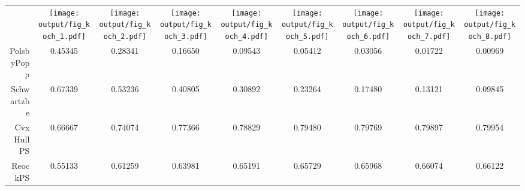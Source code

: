 \documentclass{standalone}
\begin{document}
\begin{tabular}{rcccccccc}
 & \texttt{[image: output/fig\_koch\_1.pdf]} & \texttt{[image: output/fig\_koch\_2.pdf]} & \texttt{[image: output/fig\_koch\_3.pdf]} & \texttt{[image: output/fig\_koch\_4.pdf]} & \texttt{[image: output/fig\_koch\_5.pdf]} & \texttt{[image: output/fig\_koch\_6.pdf]} & \texttt{[image: output/fig\_koch\_7.pdf]} & \texttt{[image: output/fig\_koch\_8.pdf]} \\ 
  PolsbyPopp & 0.45345 & 0.28341 & 0.16650 & 0.09543 & 0.05412 & 0.03056 & 0.01722 & 0.00969 \\ 
  Schwartzbe & 0.67339 & 0.53236 & 0.40805 & 0.30892 & 0.23264 & 0.17480 & 0.13121 & 0.09845 \\ 
  CvxHullPS & 0.66667 & 0.74074 & 0.77366 & 0.78829 & 0.79480 & 0.79769 & 0.79897 & 0.79954 \\ 
  ReockPS & 0.55133 & 0.61259 & 0.63981 & 0.65191 & 0.65729 & 0.65968 & 0.66074 & 0.66122 \\ 
\end{tabular}
\end{document}
